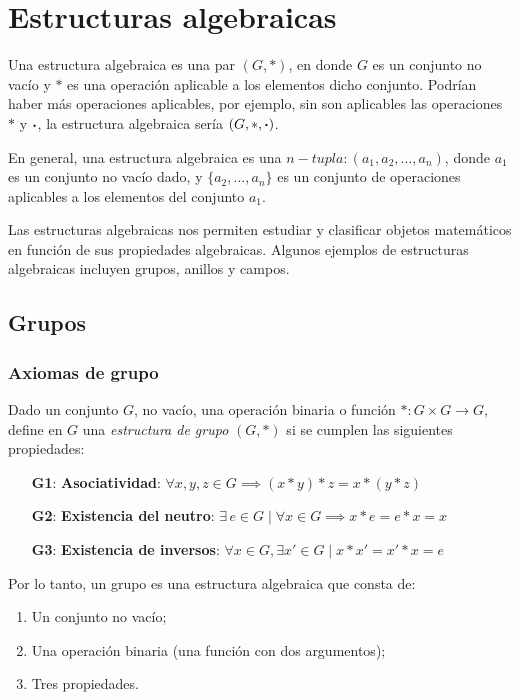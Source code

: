 \chapter{Estructuras algebraicas}

Una estructura algebraica es una par $(G, *)$, en donde $G$ es un conjunto no vacío y $*$ es una operación aplicable a los elementos dicho conjunto. Podrían haber más operaciones aplicables, por ejemplo, sin son aplicables las operaciones $*$ y $\boldsymbol{\cdot}$, la estructura algebraica sería $(G, *, \boldsymbol{\cdot})$.

En general, una estructura algebraica es una $n-tupla: (a_1, a_2, \dots, a_n)$, donde $a_1$ es un conjunto no vacío dado, y $\{ a_2, \dots, a_n \}$ es un conjunto de operaciones aplicables a los elementos del conjunto $a_1$.

Las estructuras algebraicas nos permiten estudiar y clasificar objetos matemáticos en función de sus propiedades algebraicas. Algunos ejemplos de estructuras algebraicas incluyen grupos, anillos y campos.

\section{Grupos}

\subsection{Axiomas de grupo} \label{sec:axiomas-grupo}
\vspace{2mm}
\begin{fmd-definition}[Grupo]
	Dado un conjunto $G$, no vacío, una operación binaria o función $*: G \times G \rightarrow G$, define en $G$ una \textit{estructura de grupo} $(G, *)$ si se cumplen las siguientes propiedades:
	\begin{enumerate}
		\item[\textbf{G1}:] \textbf{Asociatividad}: $\forall x, y, z \in G \implies (x*y)*z = x * (y*z)$
		\item[\textbf{G2}:] \textbf{Existencia del neutro}: $\exists \, e \in G \mid \forall x \in G \implies x*e = e*x = x$
		\item[\textbf{G3}:] \textbf{Existencia de inversos}: $\forall x \in G, \exists x' \in G \mid x * x' = x'*x = e$
	\end{enumerate}
\end{fmd-definition}

Por lo tanto, un grupo es una estructura algebraica que consta de:
\begin{enumerate}[label=\alph*)]
	\item Un conjunto no vacío;
	\item Una operación binaria (una función con dos argumentos);
	\item Tres propiedades.
\end{enumerate}

